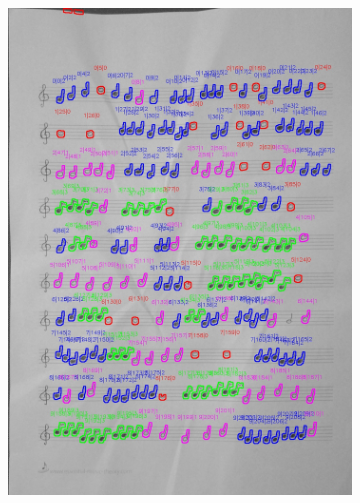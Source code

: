 \documentclass[11pt]{article}
\begin{document}
\begin{figure}[H]
\begin{subfigure}{.5\textwidth}
        \includegraphics[width=\linewidth]{20_cnts.jpg}
        \label{fig:sub2}
    \end{subfigure}
    \label{fig:test}
\end{figure}
\end{document}
